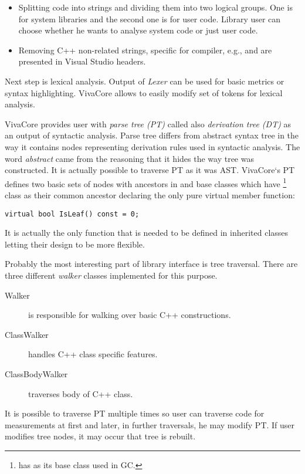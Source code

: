 \begin{itemize}
\item Splitting code into strings and dividing them into two logical groups. One is for system libraries and the second one is for user code. Library user can choose whether he wants to analyse system code or just user code.
\item Removing C++ non-related strings, specific for compiler, e.g.,  and  are presented in Visual Studio headers.
\end{itemize}

Next step is lexical analysis. Output of \emph{Lexer} can be used for basic metrics or syntax highlighting. VivaCore allows to easily modify set of tokens for lexical analysis.

VivaCore provides user with \emph{parse tree (PT)} called also \emph{derivation tree (DT)} as an output of syntactic analysis. Parse tree differs from abstract syntax tree in the way it contains nodes representing derivation rules used in syntactic analysis. The word \emph{abstract} came from the reasoning that it hides the way tree was constructed. It is actually possible to traverse PT as it was AST. VivaCore`s PT defines two basic sets of nodes with ancestors in  and  base classes which have \footnote{ has  as its base class used in GC.} class as their common ancestor declaring the only pure virtual member function:

\begin{lstlisting}
virtual bool IsLeaf() const = 0;
\end{lstlisting}

It is actually the only function that is needed to be defined in inherited classes letting their design to be more flexible.

Probably the most interesting part of library interface is tree traversal. There are three different \emph{walker} classes implemented for this purpose.

\begin{description}
\item[Walker] is responsible for walking over basic C++ constructions.
\item[ClassWalker] handles C++ class specific features.
\item[ClassBodyWalker] traverses body of C++ class.
\end{description}

It is possible to traverse PT multiple times so user can traverse code for measurements at first and later, in further traversals, he may modify PT. If user modifies tree nodes, it may occur that tree is rebuilt.

